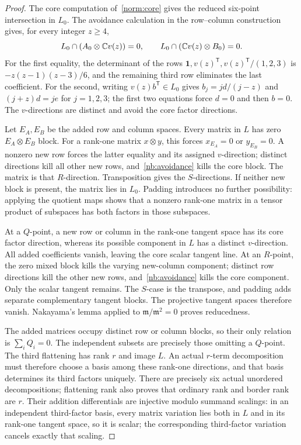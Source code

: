 \begin{proof}
The core computation of~\ref{norm:core} gives the reduced six-point
intersection in $L_0$. The avoidance calculation in the row--column
construction gives, for every integer $z\geq4$,
\begin{equation}\label{nb:avoidance}
 L_0\cap(A_0\otimes\mathbb C v(z))=0,
 \qquad L_0\cap(\mathbb C v(z)\otimes B_0)=0.
\end{equation}
For the first equality, the determinant of the rows
$\mathbf1,v(z)^{\mathsf T},v(z)^{\mathsf T}/(1,2,3)$ is
$-z(z-1)(z-3)/6$, and the remaining third row eliminates the last
coefficient. For the second, writing $v(z)b^{\mathsf T}\in L_0$
gives $b_j=jd/(j-z)$ and $(j+z)d=je$ for $j=1,2,3$;
the first two equations force $d=0$ and then $b=0$.
The $v$-directions are distinct and avoid the core factor directions.

Let $E_A,E_B$ be the added row and column spaces. Every matrix in
$L$ has zero $E_A\otimes E_B$ block. For a rank-one matrix
$x\otimes y$, this forces $x_{E_A}=0$ or $y_{E_B}=0$. A nonzero
new row forces the latter equality and its assigned $v$-direction;
distinct directions kill all other new rows, and~\eqref{nb:avoidance}
kills the core block. The matrix is that $R$-direction. Transposition
gives the $S$-directions. If neither new block is present, the matrix
lies in $L_0$. Padding introduces no further possibility: applying
the quotient maps shows that a nonzero rank-one matrix in a tensor
product of subspaces has both factors in those subspaces.

At a $Q$-point, a new row or column in the rank-one tangent space
has its core factor direction, whereas its possible component in $L$
has a distinct $v$-direction. All added coefficients vanish, leaving
the core scalar tangent line. At an $R$-point, the zero mixed block
kills the varying new-column component; distinct row directions kill
the other new rows, and~\eqref{nb:avoidance} kills the core component.
Only the scalar tangent remains. The $S$-case is the transpose, and
padding adds separate complementary tangent blocks. The projective
tangent spaces therefore vanish. Nakayama's lemma applied to
$\mathfrak m/\mathfrak m^2=0$ proves reducedness.

The added matrices occupy distinct row or column blocks, so their
only relation is $\sum_iQ_i=0$. The independent subsets are precisely
those omitting a $Q$-point. The third flattening has rank $r$ and
image $L$. An actual $r$-term decomposition must therefore choose a
basis among these rank-one directions, and that basis determines its
third factors uniquely. There are precisely six actual unordered
decompositions; flattening rank also proves that ordinary rank and
border rank are $r$. Their addition differentials are injective
modulo summand scalings: in an independent third-factor basis, every
matrix variation lies both in $L$ and in its rank-one tangent space,
so it is scalar; the corresponding third-factor variation cancels
exactly that scaling.


\end{proof}
